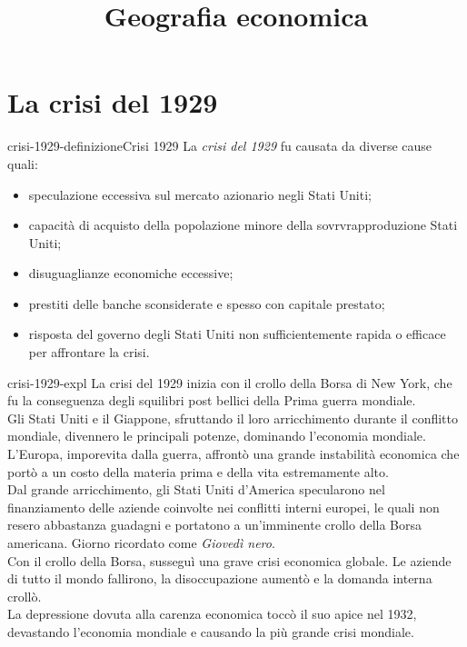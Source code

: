 \documentclass[preview]{standalone}
\begin{document}
\title{Geografia economica}
\genpage

\section{La crisi del 1929}

\begin{snippetdefinition}{crisi-1929-definizione}{Crisi 1929}
    La \textit{crisi del 1929} fu causata da diverse cause quali:
    \begin{itemize}
        \item speculazione eccessiva sul mercato azionario negli Stati Uniti;
        \item capacità di acquisto della popolazione minore della sovrvrapproduzione Stati Uniti;
        \item disuguaglianze economiche eccessive;
        \item prestiti delle banche sconsiderate e spesso con capitale prestato;
        \item risposta del governo degli Stati Uniti non sufficientemente rapida o efficace per affrontare la crisi.
    \end{itemize}
\end{snippetdefinition}

\begin{snippet}{crisi-1929-expl}
    La crisi del 1929 inizia con il crollo della Borsa di New York, che fu la conseguenza degli
    squilibri post bellici della Prima guerra mondiale.
    \\
    Gli Stati Uniti e il Giappone, sfruttando il loro arricchimento durante il conflitto mondiale,
    divennero le principali potenze, dominando l'economia mondiale.
    \\
    L'Europa, imporevita dalla guerra, affrontò una grande instabilità economica che portò a un
    costo della materia prima e della vita estremamente alto.
    \\
    Dal grande arricchimento, gli Stati Uniti d'America specularono nel finanziamento delle aziende
    coinvolte nei conflitti interni europei, le quali non resero abbastanza guadagni e portatono a
    un'imminente crollo della Borsa americana. Giorno ricordato come \textit{Giovedì nero}.
    \\
    Con il crollo della Borsa, susseguì una grave crisi economica globale.
    Le aziende di tutto il mondo fallirono, la disoccupazione aumentò e la domanda interna crollò.
    \\
    La depressione dovuta alla carenza economica toccò il suo apice nel 1932, devastando l'economia
    mondiale e causando la più grande crisi mondiale.
\end{snippet}
\end{document}
